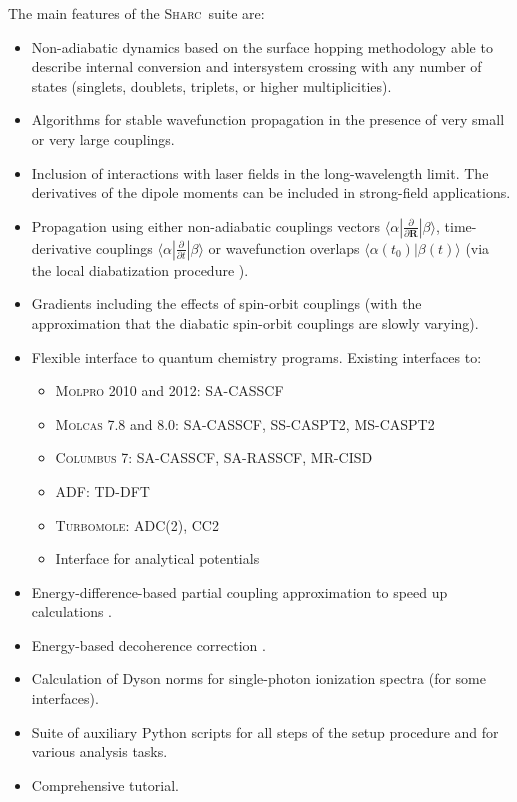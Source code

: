 \documentclass[a4paper,11pt,DIV=15,openany,twoside=false]{scrbook}
\newcommand{\sharc}{\textsc{Sharc}}
\begin{document}
The main features of the \sharc\ suite are:
\begin{itemize}
  \item Non-adiabatic dynamics based on the surface hopping methodology able to describe internal conversion and intersystem crossing with any number of states (singlets, doublets, triplets, or higher multiplicities).
  \item Algorithms for stable wavefunction propagation in the presence of very small or very large couplings.
  \item Inclusion of interactions with laser fields in the long-wavelength limit. The derivatives of the dipole moments can be included in strong-field applications.
  \item Propagation using either non-adiabatic couplings vectors $\langle\alpha|\frac{\partial}{\partial \mathbf{R}}|\beta\rangle$, time-derivative couplings $\langle\alpha|\frac{\partial}{\partial t}|\beta\rangle$ or wavefunction overlaps $\langle\alpha(t_0)|\beta(t)\rangle$ (via the local diabatization procedure \cite{Granucci2007JCP}).
  \item Gradients including the effects of spin-orbit couplings (with the approximation that the diabatic spin-orbit couplings are slowly varying).
  \item Flexible interface to quantum chemistry programs. Existing interfaces to:
  \begin{itemize}
    \item \textsc{Molpro} 2010 and 2012: SA-CASSCF
    \item \textsc{Molcas} 7.8 and 8.0: SA-CASSCF, SS-CASPT2, MS-CASPT2%
    \item \textsc{Columbus} 7: SA-CASSCF, SA-RASSCF, MR-CISD
    \item \textsc{ADF}: TD-DFT
    \item \textsc{Turbomole}: ADC(2), CC2
    \item Interface for analytical potentials
  \end{itemize}
  \item Energy-difference-based partial coupling approximation to speed up calculations \cite{Pittner2009CP}.
  \item Energy-based decoherence correction \cite{Granucci2007JCP}.
  \item Calculation of Dyson norms for single-photon ionization spectra (for some interfaces).
  \item Suite of auxiliary Python scripts for all steps of the setup procedure and for various analysis tasks.
  \item Comprehensive tutorial.
\end{itemize}
\end{document}
